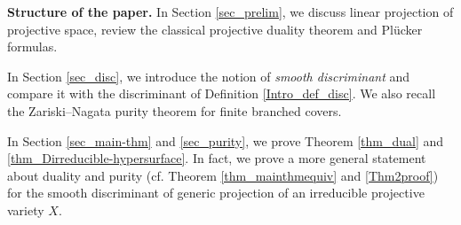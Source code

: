 \documentclass[12pt]{amsart}
\newtheorem{remark}[theorem]{Remark}
\begin{document}

\noindent\textbf{Structure of the paper.}
In Section \ref{sec_prelim}, we discuss linear projection of projective space, review the classical projective duality theorem and Pl\"ucker formulas. 

In Section \ref{sec_disc}, we introduce the notion of \textit{smooth discriminant} and compare it with the discriminant of Definition \ref{Intro_def_disc}. We also recall the Zariski--Nagata purity theorem for finite branched covers.

In Section \ref{sec_main-thm} and \ref{sec_purity}, we prove Theorem \ref{thm_dual} and \ref{thm_Dirreducible-hypersurface}. In fact, we prove a more general statement about duality and purity (cf. Theorem \ref{thm_mainthmequiv} and \ref{Thm2proof}) for the smooth discriminant of generic projection of an irreducible projective variety $X$. 
\end{document}
